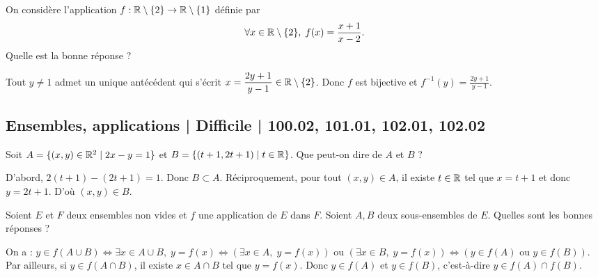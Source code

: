 \begin{question}

On considère l'application $f:\mathbb{R}\setminus\{2\}\to \mathbb{R}\setminus \{1\}$ définie par
$$\forall x\in \mathbb{R}\setminus\{2\},\; f(x)=\frac{x+1}{x-2}.$$
Quelle est la bonne réponse ?
\begin{answers}  
\end{answers}
\begin{explanations}
Tout $y\neq 1$ admet un unique antécédent qui s'écrit $\displaystyle x=\frac{2y+1}{y-1}\in \mathbb{R}\setminus\{2\}$. Donc $f$ est bijective et $\displaystyle f^{-1}(y)=\frac{2y+1}{y-1}$.
\end{explanations}
\end{question}

\subsection{Ensembles, applications | Difficile | 100.02, 101.01, 102.01, 102.02}


\begin{question}
Soit $A=\{(x,y)\in \mathbb{R}^2\mid 2x-y=1\}$ et $B=\{(t+1,2t+1)\mid t\in \mathbb{R}\}$. Que peut-on dire de $A$ et $B$ ?
\begin{answers}  
\end{answers}
\begin{explanations}
D'abord, $2(t+1)-(2t+1)=1$. Donc $B\subset A$. Réciproquement, pour tout $(x,y)\in A$, il existe $t\in \mathbb{R}$ tel que $x=t+1$ et donc $y=2t+1$. D'où $(x,y)\in B$.
\end{explanations}
\end{question}

\begin{question}

Soient $E$ et $F$ deux ensembles non vides et $f$ une application de $E$ dans $F$. Soient $A,B$ deux sous-ensembles de $E$. Quelles sont les bonnes réponses ?
\begin{answers}  
\end{answers}
\begin{explanations}
On a : $y\in f(A\cup B)\Leftrightarrow \exists x\in A\cup B,\; y=f(x)\Leftrightarrow (\exists x\in A,\; y=f(x))\mbox{ ou }(\exists x\in B,\; y=f(x))\Leftrightarrow (y\in f(A)\mbox{ ou }y\in f(B))$. Par ailleurs, si $y\in f(A\cap B)$, il existe $x\in A\cap B$ tel que $y=f(x)$. Donc $y\in f(A)$ et $y\in f(B)$, c'est-à-dire $y\in f(A)\cap f(B)$.
\end{explanations}
\end{question}


